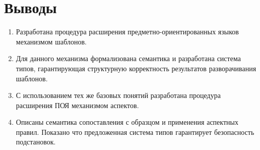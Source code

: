 \chapter{Выводы}

\begin{enumerate}
\item Разработана процедура расширения предметно-ориентированных языков механизмом шаблонов.
\item Для данного механизма формализована семантика и разработана система типов, гарантирующая структурную корректность результатов разворачивания шаблонов.
\item С использованием тех же базовых понятий разработана процедура расширения ПОЯ механизмом аспектов.
\item Описаны семантика сопоставления с образцом и применения аспектных правил. Показано что предложенная система типов гарантирует безопасность подстановок.
\end{enumerate}